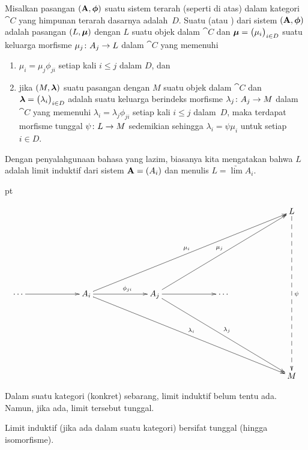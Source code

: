 \begin{defn}\label{defn_ind_lim} Misalkan pasangan $(\mathbf{A}, \boldsymbol{\phi})$ suatu sistem terarah (seperti di atas) dalam kategori~$\cat C$ yang
himpunan terarah dasarnya adalah~$D$.  Suatu
 (atau
) dari sistem $(\mathbf{A},\boldsymbol{\phi})$ adalah pasangan $(L,\boldsymbol{\mu})$ dengan $L$ suatu objek dalam $\cat C$
dan $\boldsymbol{\mu} = \bigl(\mu_i\bigr)_{i \in D}$ suatu keluarga morfisme $\mu_j\colon A_j \rightarrow L$ dalam $\cat C$ yang memenuhi
 \begin{enumerate}[label=\rm{(\alph*)}]
  \item $\mu_i = \mu_j \phi_{ji}$ setiap kali $i \le j$ dalam $D$, dan
  \item jika $(M,\boldsymbol{\lambda})$ suatu pasangan dengan $M$ suatu objek dalam $\cat C$ dan $\boldsymbol{\lambda} = \bigl(\lambda_i\bigr)_{i \in D}$
adalah suatu keluarga berindeks morfisme $\lambda_j\colon A_j \rightarrow M$ dalam $\cat C$ yang memenuhi $\lambda_i = \lambda_j\phi_{ji}$ setiap kali $i \le j$ dalam~$D$,
maka terdapat morfisme tunggal $\psi\colon L \rightarrow M$ sedemikian sehingga $\lambda_i = \psi\mu_i$ untuk setiap $i \in D$.
 \end{enumerate}
Dengan penyalahgunaan bahasa yang lazim, biasanya kita mengatakan bahwa $L$ adalah limit induktif dari sistem $\mathbf{A} = (A_i)$ dan
menulis $L = \underrightarrow{\lim} A_i$.

 pt

   \[\xymatrix@+15pt@C+25pt{&&&& L\ar@{-->}[dddd]^\psi \\
                   &&&&   \\
                  {\cdots}\ar[r] & A_i \ar[uurrr]^{\mu_i}\ar[ddrrr]^{\lambda_i}\ar[r]^(.6){\phi_{ji}} &
                       A_j\ar[uurr]^{\mu_j}\ar[ddrr]^{\lambda_j}\ar[r] & {\cdots} &  \\
                   &&&&   \\
                   &&&& M
    }\]
\end{defn}

Dalam suatu kategori (konkret) sebarang, limit induktif belum tentu ada.  Namun, jika ada, limit tersebut tunggal.

\begin{prop}\label{prop_ind_lim_unique} Limit induktif (jika ada dalam suatu kategori) bersifat tunggal (hingga isomorfisme).
\end{prop}

